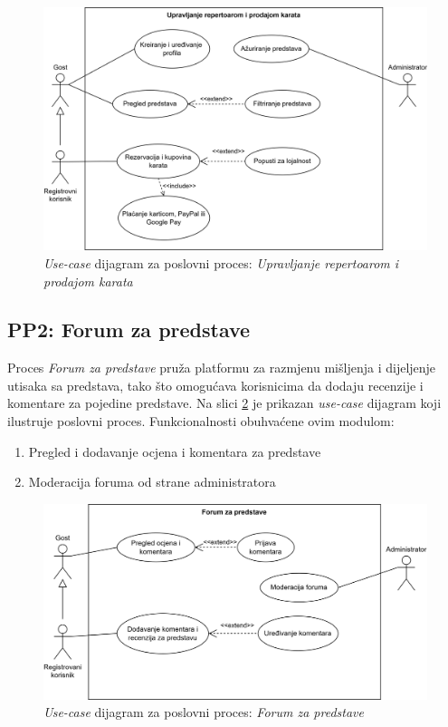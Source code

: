 \begin{figure}[!htb]
    \centering
    \includegraphics[width=1\linewidth]{Slike/Poslovni procesi/PP1.drawio.png}
    \caption{\textit{Use-case} dijagram za poslovni proces: \textit{Upravljanje repertoarom i prodajom karata}}
    \label{fig:pp1}
\end{figure}

\pagebreak
\subsection{PP2: Forum za predstave}

Proces \textit{Forum za predstave} pruža platformu za razmjenu mišljenja i dijeljenje utisaka sa predstava, tako što omogućava korisnicima da dodaju recenzije i komentare za pojedine predstave. Na slici \ref{fig:pp2} je prikazan \textit{use-case} dijagram koji ilustruje poslovni proces. Funkcionalnosti obuhvaćene ovim modulom:

\begin{enumerate}
    \item Pregled i dodavanje ocjena i komentara za predstave 
    \item Moderacija foruma od strane administratora
\end{enumerate}

\begin{figure}[!htb]
    \centering
    \includegraphics[width=0.8\linewidth]{Slike/Poslovni procesi/PP2.drawio.png}
    \caption{\textit{Use-case} dijagram za poslovni proces: \textit{Forum za predstave}}
    \label{fig:pp2}
\end{figure}


